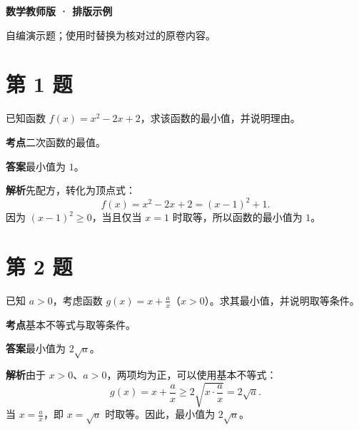 \documentclass[11pt,a4paper]{ctexart}
\newcommand{\qlabel}[1]{\par\nopagebreak\textbf{\textcolor{subjectgreen}{#1}}\quad}
\begin{document}
{\LARGE\bfseries\textcolor{subjectgreen}{数学教师版 · 排版示例}}

自编演示题；使用时替换为核对过的原卷内容。

\section*{第 1 题}
已知函数 $f(x)=x^2-2x+2$，求该函数的最小值，并说明理由。

\qlabel{考点}二次函数的最值。

\qlabel{答案}最小值为 $1$。

\qlabel{解析}先配方，转化为顶点式：
\[
f(x)=x^2-2x+2=(x-1)^2+1.
\]
因为 $(x-1)^2\geq 0$，当且仅当 $x=1$ 时取等，所以函数的最小值为 $1$。

\section*{第 2 题}
已知 $a>0$，考虑函数 $g(x)=x+\frac{a}{x}$（$x>0$）。求其最小值，并说明取等条件。

\qlabel{考点}基本不等式与取等条件。

\qlabel{答案}最小值为 $2\sqrt a$。

\qlabel{解析}由于 $x>0$、$a>0$，两项均为正，可以使用基本不等式：
\[
g(x)=x+\frac{a}{x}\geq 2\sqrt{x\cdot\frac{a}{x}}=2\sqrt a.
\]
当 $x=\frac{a}{x}$，即 $x=\sqrt a$ 时取等。因此，最小值为 $2\sqrt a$。
\end{document}
